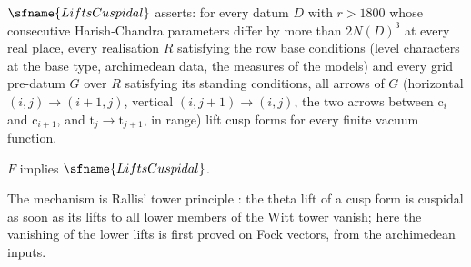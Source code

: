 \begin{definition}\label{pf:sh-theta:liftscusp}
$\sfname{LiftsCuspidal}$ asserts: for every datum $D$ with $r>1800$ whose consecutive Harish-Chandra parameters differ by more
than $2N(D)^3$ at every real place, every realisation $R$ satisfying the row base conditions (level characters at the base type,
archimedean data, the measures of the models) and every grid pre-datum $G$ over $R$ satisfying its standing conditions, all
arrows of $G$ (horizontal $(i,j)\to(i+1,j)$, vertical $(i,j+1)\to(i,j)$, the two arrows between $\mathrm c_i$ and $\mathrm c_{i+1}$,
and $\mathrm t_j\to\mathrm t_{j+1}$, in range) lift cusp forms for every finite vacuum function.
\end{definition}

\begin{theorem}\label{pf:sh-theta:cusp}
$F$ implies $\sfname{LiftsCuspidal}$.
\end{theorem}

The mechanism is Rallis' tower principle \cite{Rallis1984}: the theta lift of a cusp form is cuspidal as soon as its lifts to all
lower members of the Witt tower vanish; here the vanishing of the lower lifts is first proved on Fock vectors, from the
archimedean inputs.

